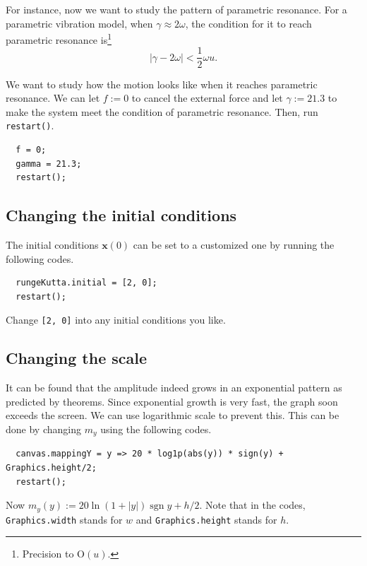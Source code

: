 \documentclass[12pt]{article}
\begin{document}
For instance, now we want to study the pattern of parametric resonance.
For a parametric vibration model, when $\gamma\approx2\omega$,
the condition for it to reach parametric resonance is\footnote{
  Precision to $\mathrm O\left(u\right)$.
} \cite[p. 82]{landau1976mechanics}
\begin{equation}
  \left|\gamma-2\omega\right|<\frac12\omega u.
\end{equation}

We want to study how the motion looks like when it reaches parametric resonance.
We can let $f:=0$ to cancel the external force
and let $\gamma:=21.3$ to make the system meet the condition of parametric resonance.
Then, run \texttt{restart()}.

\begin{verbatim}
  f = 0;
  gamma = 21.3;
  restart();
\end{verbatim}

\subsection{Changing the initial conditions}

The initial conditions $\mathbf x\!\left(0\right)$ can be set to a customized one
by running the following codes.

\begin{verbatim}
  rungeKutta.initial = [2, 0];
  restart();
\end{verbatim}

Change \texttt{[2, 0]} into any initial conditions you like.

\subsection{Changing the scale}

It can be found that the amplitude indeed grows in an exponential pattern as predicted by theorems.
Since exponential growth is very fast, the graph soon exceeds the screen.
We can use logarithmic scale to prevent this.
This can be done by changing $m_y$ using the following codes.

\begin{verbatim}
  canvas.mappingY = y => 20 * log1p(abs(y)) * sign(y) + Graphics.height/2;
  restart();
\end{verbatim}

Now $m_y\!\left(y\right):=20\ln\left(1+\left|y\right|\right)\operatorname{sgn}y+h/2$.
Note that in the codes, \texttt{Graphics.width} stands for $w$
and \texttt{Graphics.height} stands for $h$.
\end{document}
